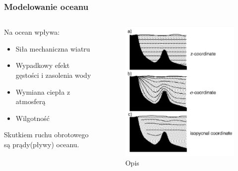 \documentclass{beamer}
\begin{document}
\begin{frame}
	\frametitle{Modelowanie oceanu}
	\begin{columns}
		\begin{column}{0.5\textwidth}
			Na ocean wpływa:
			\begin{itemize}
				\item Siła mechaniczna wiatru
				\item Wypadkowy efekt gęstości i zasolenia wody
				\item Wymiana ciepła z atmosferą
				\item Wilgotność
			\end{itemize}
			Skutkiem ruchu obrotowego są prądy(pływy) oceanu.			
			
		\end{column}
		\begin{column}{0.5\textwidth}
			\begin{figure}[h]
				\begin{center}
					\includegraphics[width=0.8\linewidth]{images/Figure5.png}
					\caption{Opis}
				\end{center}
			\end{figure}
		\end{column}
		
	\end{columns}
	
	
\end{frame}
\end{document}
